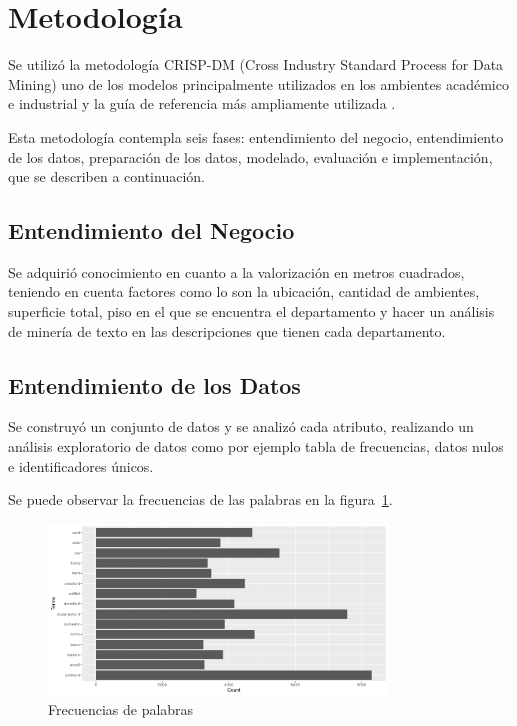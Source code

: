 \section{Metodología}

Se utilizó la metodología CRISP-DM (Cross Industry Standard Process for Data Mining) uno
de los modelos principalmente utilizados en los ambientes académico e industrial y la
guía de referencia más ampliamente utilizada \cite{hernandez2004}.

Esta metodología contempla seis fases: entendimiento del negocio, entendimiento
de los datos, preparación de los datos, modelado, evaluación e implementación, que se
describen a continuación.

\subsection{Entendimiento del Negocio}

Se adquirió conocimiento en cuanto a la valorización en metros cuadrados, teniendo en cuenta factores como lo son
la ubicación, cantidad de ambientes, superficie total, piso en el que se encuentra el departamento y hacer un análisis de
minería de texto en las descripciones que tienen cada departamento.

\subsection{Entendimiento de los Datos}
Se construyó un conjunto de datos y se analizó cada atributo, realizando un análisis exploratorio de datos como por ejemplo
tabla de frecuencias, datos nulos e identificadores únicos.

Se puede observar la frecuencias de las palabras en la figura~\ref{fig:tf}.

\begin{figure}
  \centering
  \includegraphics[width = 9cm]{tabla_frecuencias_texto.png}
  \caption{Frecuencias de palabras}
  \label{fig:tf}
\end{figure}

